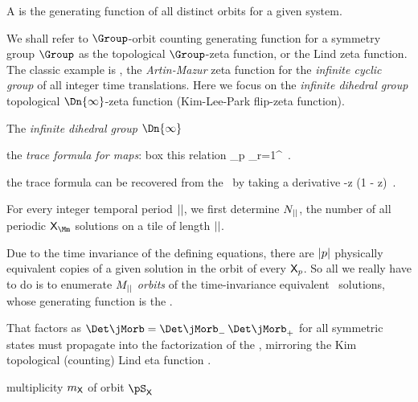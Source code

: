 A {\tzeta} is the generating function of all distinct orbits 
for a given system.

We shall refer to $\Group$-orbit  counting generating
function for a symmetry group $\Group$ as the topological $\Group$-zeta
function, or the Lind zeta function. The classic example is
, the {\em Artin-Mazur} zeta
func\-tion for the \emph{infinite cyclic group}
\Cn{\infty} of all integer time translations. Here we focus on the
\emph{infinite dihedral group} topological $\Dn{\infty}$-zeta function
(Kim-Lee-Park flip-zeta function).

The \emph{infinite dihedral group} $\Dn{\infty}$ 




the {\em trace formula for maps}:
\PC{} {box this relation}
\beq
    \sum_p  \sum_{r=1}^\infty
    {}
\,.

the trace formula  can be recovered
from the \Fd\ by taking a derivative
\beq
    -z 
          \ln \det(1 - z\Lop)
    \,.




For every integer temporal period
${||}$, we first determine $N_{||}$, the number of all periodic
\emph{{\lattstate}} ${\Xx}_{\Mm}$ solutions on a tile of length
${||}$.


Due to
the time invariance of the defining equations, there are ${|p|}$
physically equivalent copies of a given solution in the orbit of
every $\mathsf{X}_p$. So all we really have to do is to enumerate $M_{||}$
{\em orbits} of the time-invariance equivalent \po\ solutions,
whose generating function is the {\tzeta}.

\bigskip\bigskip

That {\HillDet} factors as
\(
\Det\jMorb  = \Det\jMorb_{-}\,\Det\jMorb_{+}
\)
for all symmetric states must propagate into the factorization of the
{\dzeta}, mirroring the Kim \etal{} topological (counting)
Lind eta function .

multiplicity $m_{\mathsf{X}}$ of orbit $\pS_\Xx$ 
